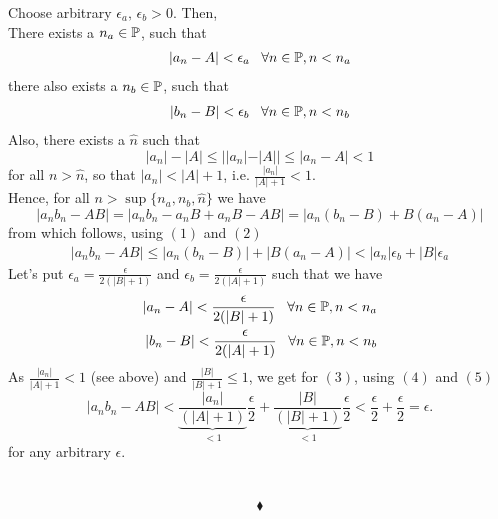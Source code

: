 Choose arbitrary $\epsilon_a,\,\epsilon_b>  0$. Then, \\ There exists a $n_a \in \mathbb{P}$, such that \begin{align}|a_n - A| < \epsilon_a \,\,\,\ \forall n\in\mathbb{P}, n<n_a\end{align}
there also exists a $n_b \in \mathbb{P}$, such that  \begin{align}|b_n - B| <\epsilon_b \,\,\,\ \forall n\in\mathbb{P}, n< n_b\end{align}
Also, there exists  a $\hat{n}$ such that
$$ |a_n|-|A| \leq ||a_n|-|A||\leq |a_n-A|<1$$
for all $n > \hat{n}$, so that $|a_n|<|A|+1$, i.e. $\frac{|a_n|}{|A|+1}<1$.\\
 Hence, for all  $n > \sup\{n_a,n_b,\hat{n}\}$ we have 
$$|a_nb_n - AB| = |a_nb_n -a_nB+a_nB-AB| = |a_n(b_n-B)+B(a_n-A)|$$ 
from which follows, using $(1)$ and $(2)$ 
\begin{align} |a_nb_n - AB|\leq |a_n(b_n-B)|+|B(a_n-A)| < |a_n|\epsilon_b+|B|\epsilon_a\end{align}
Let's put $\epsilon_a= \frac{\epsilon}{2(|B|+1)}$ and $\epsilon_b= \frac{\epsilon}{2(|A|+1)}$ such that we have
\begin{align}|a_n - A| < \frac{\epsilon}{2(|B|+1)} \,\,\,\ \forall n\in\mathbb{P}, n<n_a\\
|b_n - B| < \frac{\epsilon}{2(|A|+1)} \,\,\,\ \forall n\in\mathbb{P}, n< n_b
\end{align}
As $\frac{|a_n|}{|A|+1}<1$ (see above) and $\frac{|B|}{|B|+1}\leq 1$, we get for $(3)$, using $(4)$ and $(5)$   $$ |a_nb_n - AB|< \underbrace{\frac{|a_n|}{(|A|+1)}}_{<1}\frac{\epsilon}{2}+\underbrace{\frac{|B|}{(|B|+1)}}_{<1}\frac{\epsilon}{2}<\frac{\epsilon}{2} +\frac{\epsilon}{2} = \epsilon.$$
for any arbitrary $\epsilon$.\\\\\\
$$\blacklozenge$$


